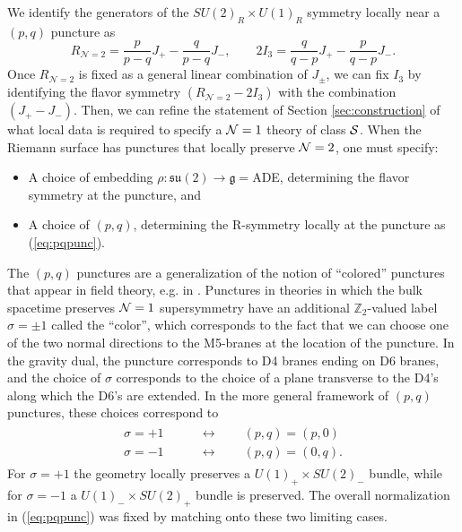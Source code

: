 \documentclass[a4paper,11pt]{article}
\newcommand{\ba}[1]{\begin{align} #1 \end{align} }
\newcommand{\bs}[1]{\begin{split} #1 \end{split} }
\def\CN{{\cal N}}
\def\CS{{\cal S}}
\begin{document}
We identify the generators of the $SU(2)_R\times U(1)_R$ symmetry locally near a $(p,q)$ puncture as 
	\begin{equation}
	R_{\mathcal{N}=2} = \frac{p}{p-q} J_+ - \frac{q}{p-q} J_-, \qquad 2 I_3 = \frac{q}{q-p} J_+ - \frac{p}{q-p} J_-.\label{eq:pqpunc}
	\end{equation}  
Once $R_{\mathcal{N}=2}$ is fixed as a general linear combination of $J_\pm$, we can fix $I_3$ by identifying the flavor symmetry $(R_{\mathcal{N}=2} -2I_3)$ with the combination $(J_+ -J_-)$. Then, we can refine the statement of Section \ref{sec:construction} of what local data is required to specify a $\CN=1$ theory of class $\CS$. When the Riemann surface has punctures that locally preserve $\CN=2$, one must specify:  
		\begin{itemize}
		\item A choice of embedding $\rho: \mathfrak{su}(2)\to \mathfrak{g} =$ADE, determining the flavor symmetry at the puncture, and
		\item A choice of $(p,q)$, determining the R-symmetry locally at the puncture as (\ref{eq:pqpunc}).
		\end{itemize} 
	
	
	The $(p,q)$ punctures are a generalization of the notion of ``colored'' punctures that appear in field theory, e.g. in \cite{Bah:2013aha,Gadde:2013fma,Agarwal:2014rua,Giacomelli:2014rna}. Punctures in theories in which the bulk spacetime preserves $\CN=1$ supersymmetry have an additional $\mathbb{Z}_2$-valued label $\sigma=\pm1$ called the ``color'', which corresponds to the fact that we can choose one of the two normal directions to the M5-branes at the location of the puncture. In the gravity dual, the puncture corresponds to D4 branes ending on D6 branes, and the choice of $\sigma$ corresponds to the choice of a plane transverse to the D4's along which the D6's are extended. In the more general framework of $(p,q)$ punctures, these choices correspond to
		\ba{\bs{
		\sigma=+1\qquad&\leftrightarrow\qquad (p,q)=(p,0)\\
		\sigma=-1\qquad&\leftrightarrow\qquad (p,q)=(0,q).
		}\label{eq:color}}
	For $\sigma=+1$ the geometry locally preserves a $U(1)_+\times SU(2)_-$ bundle, while for $\sigma=-1$ a $U(1)_-\times SU(2)_+$ bundle is preserved. The overall normalization in (\ref{eq:pqpunc}) was fixed by matching onto these two limiting cases.
\end{document}

